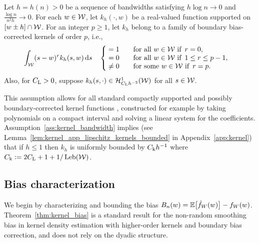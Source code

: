 \begin{assumption}
  \label{ass:kernel_bandwidth}%
  Let $h = h(n) > 0$ be a sequence of bandwidths satisfying $h \log n \to 0$
  and $\frac{\log n}{n^2h} \to 0$. For each $w \in \mathcal{W}$, let $k_h(\cdot, w)$ be
  a real-valued function supported on $[w \pm h] \cap \mathcal{W}$. For an integer
  $p \geq 1$, let $k_h$ belong to a family of boundary bias-corrected kernels
  of order $p$, i.e.,
  \begin{align*}
    \int_{\mathcal{W}}
    (s-w)^r k_h(s,w) \,\mathrm{d}s
    \quad
    \begin{cases}
      \begin{alignedat}{2}
        &= 1 &\qquad &\text{for all } w \in \mathcal{W} \text{ if }\, r = 0, \\
        &= 0 & &\text{for all } w \in \mathcal{W} \text{ if }\, 1 \leq r \leq p-1, \\
        &\neq 0 & &\text{for some } w \in \mathcal{W} \text{ if }\, r = p.
      \end{alignedat}
    \end{cases}
  \end{align*}
  Also, for $C_{\mathrm{L}} > 0$,
  suppose $k_h(s, \cdot) \in \mathcal{H}^1_{C_{\mathrm{L}} h^{-2}}(\mathcal{W})$
  for all $s \in \mathcal{W}$.
\end{assumption}

This assumption allows for all standard compactly supported and possibly
boundary-corrected kernel functions
\citep{wand1994kernel,simonoff1996smoothing}, constructed for example by taking
polynomials on a compact interval and solving a linear system for the
coefficients. Assumption~\ref{ass:kernel_bandwidth} implies
(see Lemma~\ref{lem:kernel_app_lipschitz_kernels_bounded}
in Appendix~\ref{app:kernel})
that if $h \leq 1$ then $k_h$ is uniformly bounded by
$C_{\mathrm{k}} h^{-1}$ where $C_{\mathrm{k}} \vcentcolon = 2 C_{\mathrm{L}} + 1 + 1/\operatorname{Leb}(\mathcal{W})$.

\subsection{Bias characterization}
\label{sec:kernel_bias}

We begin by characterizing and bounding the bias
$B_n(w) = \mathbb{E} \big[ \hat f_W(w) \big] - f_W(w)$.
Theorem~\ref{thm:kernel_bias} is a standard result for the non-random smoothing
bias in kernel density estimation with higher-order kernels and boundary bias
correction, and does not rely on the dyadic structure.

